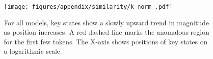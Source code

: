 \begin{figure}[ht]
    \centering
    \texttt{[image: figures/appendix/similarity/k\_norm\_.pdf]}
    \caption{For all models, key states show a slowly upward trend in magnitude as position increases. A red dashed line marks the anomalous region for the first few tokens. The X-axis shows positions of key states on a logarithmic scale.} 
    \label{fig:app:norm:k}
\end{figure}